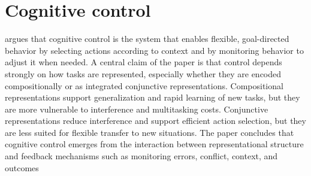 \documentclass[a4paper]{article}
\title{}
\date{}
\begin{document}
    \maketitle
    
    
    \section{Cognitive control}
        \cite{badre-2025-cognitive-control} argues that cognitive control is the system that enables flexible, goal-directed behavior by selecting actions according to context and by monitoring behavior to adjust it when needed. A central claim of the paper is that control depends strongly on how tasks are represented, especially whether they are encoded compositionally or as integrated conjunctive representations. Compositional representations support generalization and rapid learning of new tasks, but they are more vulnerable to interference and multitasking costs.
        Conjunctive representations reduce interference and support efficient action selection, but they are less suited for flexible transfer to new situations. The paper concludes that cognitive control emerges from the interaction between representational structure and feedback mechanisms such as monitoring errors, conflict, context, and outcomes
        
        
        
\end{document}

